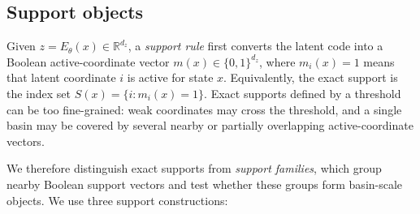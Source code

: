 \documentclass[11pt]{article}
\newcommand{\Enc}{E_\theta}
\theoremstyle{plain}
\theoremstyle{definition}
\begin{document}
\subsection{Support objects}
\label{sec:method_supports}

Given \(z=\Enc(x)\in\mathbb{R}^{d_z}\), a \textit{support rule} first converts the latent code into a Boolean active-coordinate vector \(m(x)\in\{0,1\}^{d_z}\), where \(m_i(x)=1\) means that latent coordinate \(i\) is active for state \(x\). Equivalently, the exact support is the index set \(S(x)=\{i:m_i(x)=1\}\). Exact supports defined by a threshold can be too fine-grained: weak coordinates may cross the threshold, and a single basin may be covered by several nearby or partially overlapping active-coordinate vectors.

We therefore distinguish exact supports from \emph{support families}, which group nearby Boolean support vectors and test whether these groups form basin-scale objects.
We use three support constructions:
\end{document}
